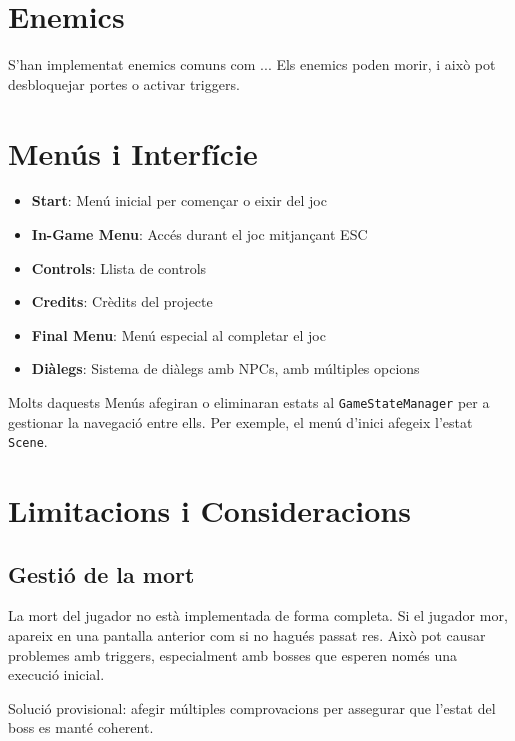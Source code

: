 \documentclass[a4paper,12pt]{article}
\begin{document}
\section{Enemics}
S'han implementat enemics comuns com ... Els enemics poden morir, i això pot desbloquejar portes o activar triggers.

\section{Menús i Interfície}

\begin{itemize}
    \item \textbf{Start}: Menú inicial per començar o eixir del joc
    \item \textbf{In-Game Menu}: Accés durant el joc mitjançant ESC
    \item \textbf{Controls}: Llista de controls
    \item \textbf{Credits}: Crèdits del projecte
    \item \textbf{Final Menu}: Menú especial al completar el joc
    \item \textbf{Diàlegs}: Sistema de diàlegs amb NPCs, amb múltiples opcions
\end{itemize}

Molts daquests Menús afegiran o eliminaran estats al \texttt{GameStateManager} per a gestionar la navegació entre ells. Per exemple, el menú d'inici afegeix l'estat \texttt{Scene}. 

\section{Limitacions i Consideracions}

\subsection{Gestió de la mort}
La mort del jugador no està implementada de forma completa. Si el jugador mor, apareix en una pantalla anterior com si no hagués passat res. Això pot causar problemes amb triggers, especialment amb bosses que esperen només una execució inicial.

Solució provisional: afegir múltiples comprovacions per assegurar que l'estat del boss es manté coherent.
\end{document}
